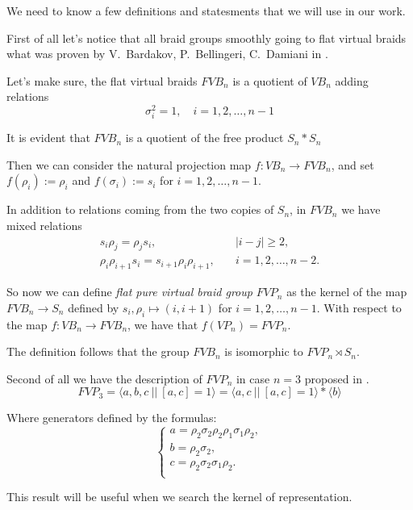\documentclass{article}
\begin{document}
We need to know a few definitions and statesments that we will use in our work.

First of all let's notice that all braid groups smoothly going to flat virtual braids what was proven by V.~Bardakov, P.~Bellingeri, C.~Damiani in \cite{BarBelDom}. 

Let's make sure, the flat virtual braids $FVB_n$ is a quotient of $VB_n$ adding relations 
$$ \sigma_i^2=1, \quad i = 1, 2, \dots,n-1 $$

It is evident that $FVB_n$ is a quotient of the free product $S_n*S_n$

Then we can consider the natural projection map $f:VB_n \rightarrow FVB_n$, and set $f(\rho_i):= \rho_i$ and $f(\sigma_i):= s_i$ for $i = 1, 2, \dots, n-1$. 

In addition to relations coming from the two copies of $S_n$, in $FVB_n$ we have mixed relations 
\begin{align*}
s_i\rho_j = \rho_js_i, &\quad |i-j| \ge 2,\\
\rho_i\rho_{i+1}s_i = s_{i+1}\rho_i\rho_{i+1}, &\quad i = 1, 2, \dots, n-2.
\end{align*}

So now we can define \textit{flat pure virtual braid group} $FVP_n$ as the kernel of the map  $FVB_n \to S_n$ defined by $s_i, \rho_i \mapsto (i, i+1)$ for $i = 1, 2, \dots, n-1$. With respect to the map $f:VB_n \to FVB_n$, we have that $f(VP_n) = FVP_n$. 

The definition follows that the group $FVB_n$ is isomorphic to $FVP_n\rtimes S_n$.

\vspace{6pt}Second of all we have the description of $FVP_n$ in case $n = 3$ proposed in \cite{BarBelDom}.
$$FVP_3 = \langle a, b, c ~|| ~ [a,c] = 1 \rangle  = \langle a, c~||~[a,c] = 1 \rangle * \langle b \rangle$$

Where generators defined by the formulas:
$$ 
\begin{cases}
a = \rho_2\sigma_2\rho_2\rho_1\sigma_1\rho_2, \\
b = \rho_2\sigma_2,\\
c = \rho_2\sigma_2\sigma_1\rho_2.\\
\end{cases}
$$

This result will be useful when we search the kernel of representation.
\end{document}
